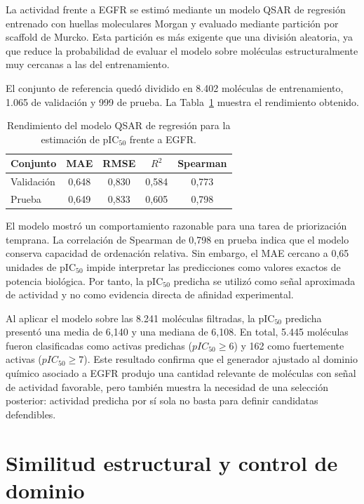 \documentclass[IB]{TFUOC}%
\begin{document}
La actividad frente a EGFR se estimó mediante un modelo QSAR de regresión entrenado con huellas moleculares Morgan y evaluado mediante partición por scaffold de Murcko. Esta partición es más exigente que una división aleatoria, ya que reduce la probabilidad de evaluar el modelo sobre moléculas estructuralmente muy cercanas a las del entrenamiento.

El conjunto de referencia quedó dividido en 8.402 moléculas de entrenamiento, 1.065 de validación y 999 de prueba. La Tabla~\ref{tab:metricas_qsar_resultados} muestra el rendimiento obtenido.

\begin{table}[H]
    \centering
    \small
    \begin{tabular}{l c c c c}
        \hline
        \textbf{Conjunto} & \textbf{MAE} & \textbf{RMSE} & \textbf{$R^2$} & \textbf{Spearman} \\
        \hline
        Validación & 0,648 & 0,830 & 0,584 & 0,773 \\
        Prueba & 0,649 & 0,833 & 0,605 & 0,798 \\
        \hline
    \end{tabular}
    \caption{Rendimiento del modelo QSAR de regresión para la estimación de pIC$_{50}$ frente a EGFR.}
    \label{tab:metricas_qsar_resultados}
\end{table}

El modelo mostró un comportamiento razonable para una tarea de priorización temprana. La correlación de Spearman de 0,798 en prueba indica que el modelo conserva capacidad de ordenación relativa. Sin embargo, el MAE cercano a 0,65 unidades de pIC$_{50}$ impide interpretar las predicciones como valores exactos de potencia biológica. Por tanto, la pIC$_{50}$ predicha se utilizó como señal aproximada de actividad y no como evidencia directa de afinidad experimental.

Al aplicar el modelo sobre las 8.241 moléculas filtradas, la pIC$_{50}$ predicha presentó una media de 6,140 y una mediana de 6,108. En total, 5.445 moléculas fueron clasificadas como activas predichas ($pIC_{50} \geq 6$) y 162 como fuertemente activas ($pIC_{50} \geq 7$). Este resultado confirma que el generador ajustado al dominio químico asociado a EGFR produjo una cantidad relevante de moléculas con señal de actividad favorable, pero también muestra la necesidad de una selección posterior: actividad predicha por sí sola no basta para definir candidatas defendibles.

\section{Similitud estructural y control de dominio}
\end{document}
